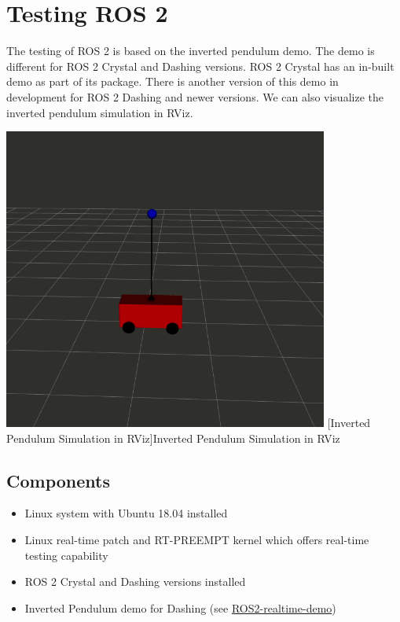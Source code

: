 \documentclass[%
xelatex,
	oneside,		%
	12pt,			%
	parskip=half,	%
	abstracton,
	chapterprefix=true%
    appendixprefix=true]
{scrbook}
\begin{document}
\section{Testing ROS 2}
\vspace*{0.5cm}
The testing of ROS 2 is based on the inverted pendulum demo. The demo is different for ROS 2 Crystal and Dashing versions. ROS 2 Crystal has an in-built demo as part of its package. There is another version of this demo in development for ROS 2 Dashing and newer versions. We can also visualize the inverted  pendulum simulation in RViz.
			\begin{center}
\includegraphics[scale=0.51]{fig/invertedpendulum.png}
[Inverted Pendulum Simulation in RViz]{Inverted Pendulum Simulation in RViz}
\label{fig:invertedpendulum}
\end{center}

	\subsection{Components}
	\vspace*{0.5cm}
	\begin{itemize}
	\item Linux system with Ubuntu 18.04 installed
	\item Linux real-time patch and RT-PREEMPT kernel which offers real-time testing capability
	\item ROS 2 Crystal and Dashing versions installed
	\item Inverted Pendulum demo for Dashing (see \href{https://github.com/ros2-realtime-demo/pendulum}{ROS2-realtime-demo}\cite{rtpendulum}) 
	\end{itemize}
\end{document}
